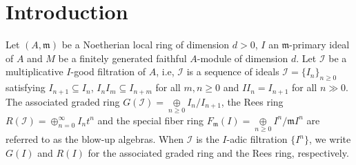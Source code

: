 \documentclass[11pt,reqno]{amsart}
\theoremstyle{definition}
\newcommand{\m}{\mathfrak m}
\def\I{{\mathcal I}}
\DeclareMathOperator{\depth}{depth}
\numberwithin{equation}{section}
\begin{document}
\begin{abstract}
    
	\end{abstract}
	\maketitle
	
	\section{Introduction} 
Let $(A,\m)$ be a Noetherian local ring of dimension $d>0$, $I$ an $\m$-primary ideal of $A$ and $M$ be a finitely generated faithful $A$-module of dimension
    $d$. Let $\I$ be a multiplicative $I$-good filtration of $A$, i.e, $\I$ is a sequence of ideals $\I=\{I_n\}_{n\geq 0}$ satisfying $I_{n+1}\subseteq I_n$, $I_nI_m\subseteq I_{n+m}$ for all $m, n \geq 0$ and $II_n=I_{n+1}$ for all $n\gg 0 $. The associated graded ring $G(\I)=\mathop{\oplus}\limits_{n\geq 0} I_n/I_{n+1}$, the Rees ring $R(\mathcal{I})=\oplus_{n=0}^\infty I_nt^n$ and the special fiber ring $F_{\m}(I)=\mathop\oplus\limits_{n\geq 0}I^n/\m I^n$ are referred to as the blow-up algebras. When $\I$ is the $I$-adic filtration $\{I^n\}$, we write $G(I)$ and $R(I)$ for the associated graded ring and the Rees ring, respectively. 
	
\end{document}
